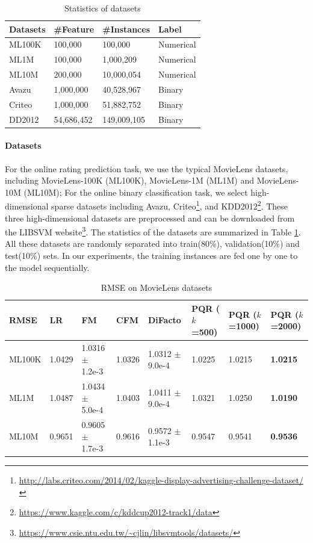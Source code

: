 \documentclass[letterpaper]{article} %
\theoremstyle{plain}
\theoremstyle{definition}
\begin{document}
\begin{table}
  \caption{Statistics of datasets}
  \label{dataset_stats}
  \centering
  \begin{tabular}{llll}
    \toprule
    Datasets     & \#Feature & \#Instances    & Label \\
    \midrule
    ML100K & 100,000  & 100,000  & Numerical   \\
    ML1M & 100,000  & 1,000,209  & Numerical \\
    ML10M & 200,000 & 10,000,054 & Numerical \\
    \midrule
    Avazu & 1,000,000 & 40,528,967 & Binary \\
    Criteo & 1,000,000 & 51,882,752 & Binary \\
    DD2012 & 54,686,452 & 149,009,105 & Binary \\
    \bottomrule
  \end{tabular}
\end{table}

\paragraph{Datasets} For the online rating prediction task, we use the typical MovieLens datasets, including MovieLens-100K (ML100K), MovieLens-1M (ML1M) and MovieLens-10M (ML10M); For the online binary classification task, we select high-dimensional sparse datasets including Avazu, Criteo\footnote{\url{http://labs.criteo.com/2014/02/kaggle-display-advertising-challenge-dataset/}}, and KDD2012\footnote{\url{https://www.kaggle.com/c/kddcup2012-track1/data}}. These three high-dimensional datasets are preprocessed and can be downloaded from the LIBSVM website\footnote{\url{https://www.csie.ntu.edu.tw/~cjlin/libsvmtools/datasets/}}. The statistics of the datasets are summarized in Table \ref{dataset_stats}. All these datasets are randomly separated into train(80\%), validation(10\%) and test(10\%) sets. In our experiments, the training instances are fed one by one to the model sequentially.

\begin{table}[]
  \caption{RMSE on MovieLens datasets}
  \label{rmse_mvl}
  \centering
  \begin{tabular}{llllllll}
    \toprule
    RMSE   & LR     & FM                  & CFM    & DiFacto             & PQR ($k$=500) & PQR ($k$=1000) & PQR ($k$=2000)\\
    \midrule
    ML100K & 1.0429 & 1.0316 $\pm$ 1.2e-3 & 1.0326 & 1.0312 $\pm$ 9.0e-4 & 1.0225    & 1.0215     & \textbf{1.0215} \\
    ML1M   & 1.0487 & 1.0434 $\pm$ 5.0e-4 & 1.0403 & 1.0411 $\pm$ 9.0e-4 & 1.0321    & 1.0250     & \textbf{1.0190} \\
    ML10M  & 0.9651 & 0.9605 $\pm$ 1.7e-3 & 0.9616 & 0.9572 $\pm$ 1.1e-3 & 0.9547    & 0.9541     & \textbf{0.9536} \\
    \bottomrule
  \end{tabular}
\end{table}
\end{document}
